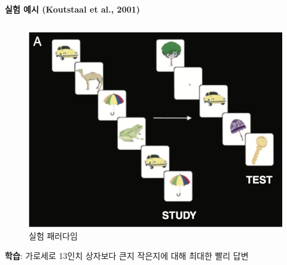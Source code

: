 \documentclass{beamer}
\begin{document}
\begin{frame}{\textbf{실험 예시 (Koutstaal et al., 2001)}}
  \begin{columns}
    \begin{column}{0.4\textwidth}
      \begin{figure}
        \centering
        \includegraphics[width=\textwidth]{image/Koutstaal}
        \caption{실험 패러다임}
      \end{figure}
      \vspace{-1em}
      \textbf{학습}: 가로세로 13인치 상자보다 큰지 작은지에 대해 최대한 빨리 답변\\~\\


\end{column}
\end{columns}
\end{frame}
\end{document}
